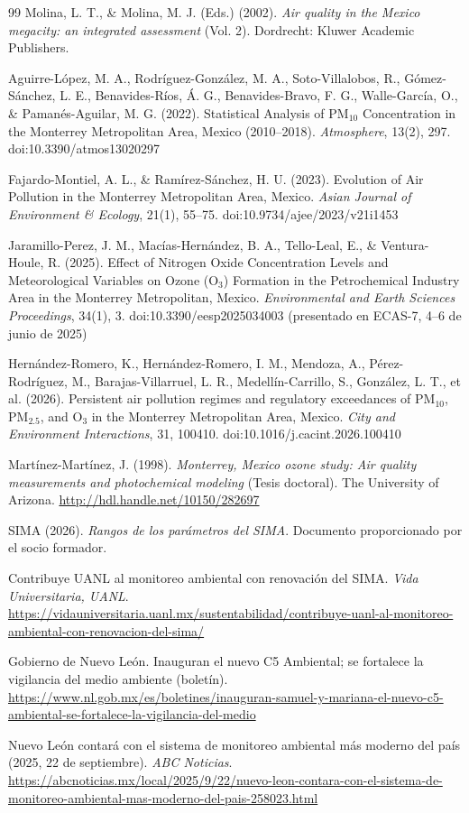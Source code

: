 \documentclass[11pt,letterpaper]{article}
\begin{document}
\begin{thebibliography}{99}
 Molina, L. T., \& Molina, M. J. (Eds.) (2002). \textit{Air quality in the Mexico megacity: an integrated assessment} (Vol. 2). Dordrecht: Kluwer Academic Publishers.

 Aguirre-L\'opez, M. A., Rodr\'iguez-Gonz\'alez, M. A., Soto-Villalobos, R., G\'omez-S\'anchez, L. E., Benavides-R\'ios, \'A. G., Benavides-Bravo, F. G., Walle-Garc\'ia, O., \& Paman\'es-Aguilar, M. G. (2022). Statistical Analysis of PM$_{10}$ Concentration in the Monterrey Metropolitan Area, Mexico (2010--2018). \textit{Atmosphere}, 13(2), 297. doi:10.3390/atmos13020297

 Fajardo-Montiel, A. L., \& Ram\'irez-S\'anchez, H. U. (2023). Evolution of Air Pollution in the Monterrey Metropolitan Area, Mexico. \textit{Asian Journal of Environment \& Ecology}, 21(1), 55--75. doi:10.9734/ajee/2023/v21i1453

 Jaramillo-Perez, J. M., Mac\'ias-Hern\'andez, B. A., Tello-Leal, E., \& Ventura-Houle, R. (2025). Effect of Nitrogen Oxide Concentration Levels and Meteorological Variables on Ozone (O$_3$) Formation in the Petrochemical Industry Area in the Monterrey Metropolitan, Mexico. \textit{Environmental and Earth Sciences Proceedings}, 34(1), 3. doi:10.3390/eesp2025034003 (presentado en ECAS-7, 4--6 de junio de 2025)

 Hern\'andez-Romero, K., Hern\'andez-Romero, I. M., Mendoza, A., P\'erez-Rodr\'iguez, M., Barajas-Villarruel, L. R., Medell\'in-Carrillo, S., Gonz\'alez, L. T., et al. (2026). Persistent air pollution regimes and regulatory exceedances of PM$_{10}$, PM$_{2.5}$, and O$_3$ in the Monterrey Metropolitan Area, Mexico. \textit{City and Environment Interactions}, 31, 100410. doi:10.1016/j.cacint.2026.100410

 Mart\'inez-Mart\'inez, J. (1998). \textit{Monterrey, Mexico ozone study: Air quality measurements and photochemical modeling} (Tesis doctoral). The University of Arizona. \url{http://hdl.handle.net/10150/282697}

 SIMA (2026). \textit{Rangos de los par\'ametros del SIMA}. Documento proporcionado por el socio formador.

 Contribuye UANL al monitoreo ambiental con renovaci\'on del SIMA. \textit{Vida Universitaria, UANL}. \url{https://vidauniversitaria.uanl.mx/sustentabilidad/contribuye-uanl-al-monitoreo-ambiental-con-renovacion-del-sima/}

 Gobierno de Nuevo Le\'on. Inauguran el nuevo C5 Ambiental; se fortalece la vigilancia del medio ambiente (bolet\'in). \url{https://www.nl.gob.mx/es/boletines/inauguran-samuel-y-mariana-el-nuevo-c5-ambiental-se-fortalece-la-vigilancia-del-medio}

 Nuevo Le\'on contar\'a con el sistema de monitoreo ambiental m\'as moderno del pa\'is (2025, 22 de septiembre). \textit{ABC Noticias}. \url{https://abcnoticias.mx/local/2025/9/22/nuevo-leon-contara-con-el-sistema-de-monitoreo-ambiental-mas-moderno-del-pais-258023.html}

\end{thebibliography}
\end{document}
